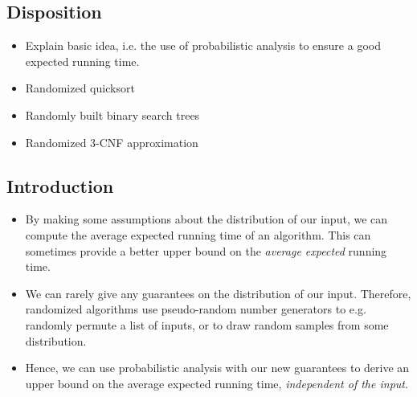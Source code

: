 
\subsection{Disposition}
\begin{itemize}
\item Explain basic idea, i.e. the use of probabilistic analysis to
  ensure a good expected running time.
\item Randomized quicksort
\item Randomly built binary search trees
\item Randomized 3-CNF approximation
\end{itemize}

\subsection{Introduction}
\begin{itemize}
\item By making some assumptions about the distribution of our input,
  we can compute the average expected running time of an
  algorithm. This can sometimes provide a better upper bound on the
  \emph{average expected} running time.
\item We can rarely give any guarantees on the distribution of our
  input. Therefore, randomized algorithms use pseudo-random number
  generators to e.g. randomly permute a list of inputs, or to draw
  random samples from some distribution.
\item Hence, we can use probabilistic analysis with our new guarantees
  to derive an upper bound on the average expected running time,
  \emph{independent of the input}.
\end{itemize}

